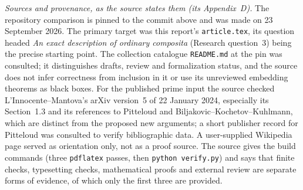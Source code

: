 \documentclass[11pt,letterpaper]{article}
\theoremstyle{definition}
\theoremstyle{remark}
\newcommand{\rpath}[1]{\nolinkurl{#1}}%
\numberwithin{equation}{section}
\begin{document}
\emph{Sources and provenance, as the source states them (its Appendix~D).}
The repository comparison is pinned to the commit above and was made on
23 September 2026. The primary target was this report's
\texttt{article.tex}, its question headed \emph{An exact description of
ordinary composita} (Research question~3) being the precise starting point.
The collection catalogue \rpath{README.md} at the pin was consulted; it
distinguishes drafts, review and formalization status, and the source does
not infer correctness from inclusion in it or use its unreviewed embedding
theorems as black boxes. For the published prime input the source checked
L'Innocente--Mantova's arXiv version~5 of 22 January 2024, especially its
Section~1.3 and its references to Pitteloud and Biljakovic--Kochetov--Kuhlmann,
which are distinct from the proposed new arguments; a short publisher
record for Pitteloud was consulted to verify bibliographic data. A
user-supplied Wikipedia page served as orientation only, not as a proof
source. The source gives the build commands (three \texttt{pdflatex} passes,
then \texttt{python verify.py}) and says that finite checks, typesetting
checks, mathematical proofs and external review are separate forms of
evidence, of which only the first three are provided.
\end{document}
